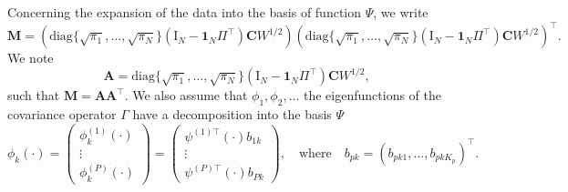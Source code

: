 Concerning the expansion of the data into the basis of function $\Psi$, we write 
\begin{equation}
    \mathbf{M} = \left(\text{diag}\{
        \sqrt{\pi_1}, \dots, \sqrt{\pi_N}\}\left(\mathrm{I}_{\!N} - \mathbf{1}_{\!N}\Pi^\top\right) \mathbf{C}W^{1/2}\right)\left(\text{diag}\{
        \sqrt{\pi_1}, \dots, \sqrt{\pi_N}\}\left(\mathrm{I}_{\!N} - \mathbf{1}_{\!N}\Pi^\top\right) \mathbf{C}W^{1/2}\right)^\top.
\end{equation}
We note
\begin{equation}
    \mathbf{A} = \text{diag}\{\sqrt{\pi_1}, \dots, \sqrt{\pi_N}\}\left(\mathrm{I}_{\!N} - \mathbf{1}_{\!N}\Pi^\top\right) \mathbf{C}W^{1/2},
\end{equation}
such that $\mathbf{M} = \mathbf{A}\mathbf{A}^\top$.
We also assume that $\phi_1, \phi_2, \dots$ the eigenfunctions of the covariance operator $\Gamma$ have a decomposition into the basis $\Psi$
\begin{equation}
    \phi_k(\cdot) = 
        \begin{pmatrix} 
            \phi_k^{(1)}(\cdot) \\
            \vdots \\
            \phi_k^{(P)}(\cdot)
        \end{pmatrix} = 
        \begin{pmatrix} 
            \psi^{(1) \top}(\cdot) b_{1k} \\
            \vdots \\
            \psi^{(P) \top}(\cdot) b_{Pk}
        \end{pmatrix}, \quad\text{where}\quad
        b_{pk} = \left(b_{p k 1}, \dots, b_{p k K_p} \right)^\top.
\end{equation}

